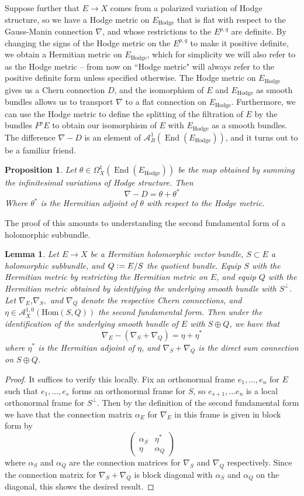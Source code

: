 \documentclass[psamsfonts, 12pt]{amsart}
\newtheorem{prop}[thm]{Proposition}
\newtheorem{lem}[thm]{Lemma}
\theoremstyle{definition}
\theoremstyle{remark}
\renewcommand{\hom}{\mathrm{Hom}}
\newcommand{\defeq}{\vcentcolon=}
\DeclareMathOperator{\End}{End}
\begin{document}
Suppose further that $E \to X$ comes from a polarized variation of
Hodge structure, so we have a Hodge metric on $E_{\mathrm{Hodge}}$
that is flat with respect to the Gauss-Manin connection $\nabla$, and
whose restrictions to the $E^{p,q}$ are definite. By changing the signs
of the Hodge metric on the $E^{p,q}$ to make it positive definite, we obtain
a Hermitian metric on $E_{\mathrm{Hodge}}$, which for simplicity we will
also refer to as the Hodge metric -- from now on ``Hodge metric" will always
refer to the positive definite form unless specified otherwise. The
Hodge metric on $E_{\mathrm{Hodge}}$ gives us a Chern connection
$D$, and the isomorphism of $E$ and $E_{\mathrm{Hodge}}$ as smooth bundles
allows us to transport $\nabla$ to a flat connection on $E_{\mathrm{Hodge}}$.
Furthermore, we can use the Hodge metric to define the splitting
of the filtration of $E$ by the bundles $F^pE$ to obtain our
isomorphism of $E$ with $E_{\mathrm{Hodge}}$ as a smooth bundles.
The difference $\nabla - D$ is an element of
$\mathcal{A}^1_B(\End(E_\mathrm{Hodge}))$, and it turns out to be a familiar friend.
%
\begin{prop}
Let $\theta \in \Omega^1_X(\End(E_\mathrm{Hodge}))$ be the map obtained by summing the
infinitesimal variations of Hodge structure. Then
\[
\nabla - D = \theta + \theta^*
\]
Where $\theta^*$ is the Hermitian adjoint of $\theta$ with respect to the Hodge
metric.
\end{prop}
%
The proof of this amounts to understanding the second fundamental form
of a holomorphic subbundle.
%
\begin{lem}
Let $E \to X$ be a Hermitian holomorphic vector bundle, $S \subset E$ a
holomorphic subbundle, and $Q \defeq E/S$ the quotient bundle. Equip
$S$ with the Hermitian metric by restricting the Hermitian metric on $E$,
and equip $Q$ with the Hermitian metric obtained by identifying the
underlying smooth bundle with $S^\perp$. Let $\nabla_E$,$\nabla_S,$ and $\nabla_Q$
denote the respective Chern connections, and
$\eta \in \mathcal{A}^{1,0}_X(\hom(S,Q))$ the second fundamental form.
Then under the identification of the underlying smooth bundle of $E$
with $S \oplus Q$, we have that
\[
\nabla_E - (\nabla_S + \nabla_Q) = \eta + \eta^*
\]
where $\eta^*$ is the Hermitian adjoint of $\eta$, and $\nabla_S + \nabla_Q$
is the direct sum connection on $S \oplus Q$.
\end{lem}
%
\begin{proof}
It suffices to verify this locally. Fix an orthonormal frame $e_1,\ldots, e_n$
for $E$ such that $e_1, \ldots, e_s$ forms an orthonormal frame for
$S$, so $e_{s+1},\ldots e_n$ is a local orthonormal frame for $S^\perp$. Then by
the definition of the second fundamental form we have that the connection matrix
$\alpha_E$ for $\nabla_E$ in this frame is given in block form by
\[
\begin{pmatrix}
\alpha_S & \eta^* \\
\eta & \alpha_Q
\end{pmatrix}
\]
where $\alpha_S$ and $\alpha_Q$ are the connection matrices for $\nabla_S$ and
$\nabla_Q$ respectively. Since the connection matrix for $\nabla_S + \nabla_Q$
is block diagonal with $\alpha_S$ and $\alpha_Q$ on the diagonal, this
shows the desired result.
\end{proof}
\end{document}
